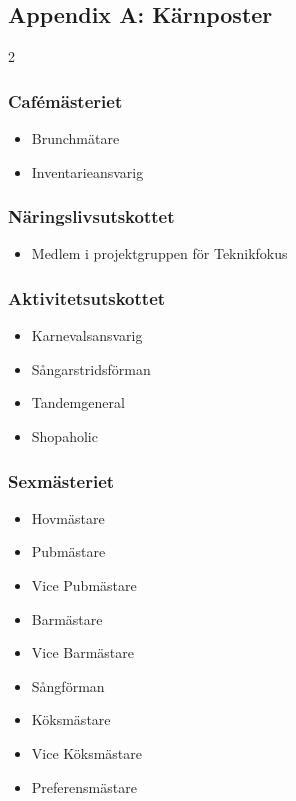 \documentclass{dsekprotokoll}
\begin{document}
\pagebreak
\subsection*{Appendix A: Kärnposter}
\begin{multicols}{2}

    \subsubsection*{Cafémästeriet}
    \begin{itemize}
        \item Brunchmätare
        \item Inventarieansvarig
    \end{itemize}

    \subsubsection*{Näringslivsutskottet}
    \begin{itemize}
        \item Medlem i projektgruppen för Teknikfokus
    \end{itemize}


    \subsubsection*{Aktivitetsutskottet}
    \begin{itemize}
        \item Karnevalsansvarig
        \item Sångarstridsförman
        \item Tandemgeneral
        \item Shopaholic
    \end{itemize}


    \subsubsection*{Sexmästeriet}
    \begin{itemize}
        \item Hovmästare
        \item Pubmästare
        \item Vice Pubmästare
        \item Barmästare
        \item Vice Barmästare
        \item Sångförman
        \item Köksmästare
        \item Vice Köksmästare
        \item Preferensmästare
    \end{itemize}


\end{multicols}
\end{document}
